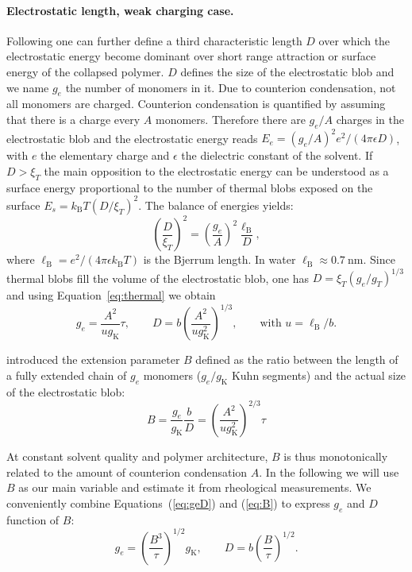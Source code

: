 \documentclass[twoside,twocolumn,9pt]{article}
\begin{document}
\paragraph{Electrostatic length, weak charging case.}
Following \citet{Khokhlov1980} one can further define a third characteristic length $D$ over which the electrostatic energy become dominant over short range attraction or surface energy of the collapsed polymer. $D$ defines the size of the electrostatic blob and we name $g_e$ the number of monomers in it. Due to counterion condensation, not all monomers are charged. Counterion condensation is quantified by assuming that there is a charge every $A$ monomers. Therefore there are $g_e/A$ charges in the electrostatic blob and the electrostatic energy reads $E_e = (g_e/A)^2 e^2/(4\pi\epsilon D)$, with $e$ the elementary charge and $\epsilon$ the dielectric constant of the solvent. If $D>\xi_T$ the main opposition to the electrostatic energy can be understood as a surface energy proportional to the number of thermal blobs exposed on the surface $E_s = k_\mathrm{B}T (D/\xi_T)^2$. The balance of energies yields:
\begin{equation}\left(\frac{D}{\xi_T}\right)^2 = \left(\frac{g_e}{A}\right)^2 \frac{\ell_\mathrm{B}}{D},
\label{eq:electrosurface}
\end{equation}
where $\ell_\mathrm{B} = e^2/(4\pi\epsilon k_\mathrm{B}T)$ is the Bjerrum length. In water $\ell_\mathrm{B} \approx \SI{0.7}{\nano\metre}$. Since thermal blobs fill the volume of the electrostatic blob, one has $D = \xi_T \left(g_e/g_T\right)^{1/3}$ and using Equation~\eqref{eq:thermal} we obtain
\begin{equation}
g_e = \frac{A^2}{u g_\mathrm{K}} \tau, \qquad D = b\left(\frac{A^2}{u g_\mathrm{K}^2}\right)^{1/3},\qquad \text{with }u = \ell_\mathrm{B}/b.
\label{eq:geD}
\end{equation}

\citet{Dobrynin1995} introduced the extension parameter $B$ defined as the ratio between the length of a fully extended chain of $g_e$ monomers ($g_e/g_\mathrm{K}$ Kuhn segments) and the actual size of the electrostatic blob: 
\begin{equation}
B = \frac{g_e}{g_\mathrm{K}}\frac{b}{D} = \left(\frac{A^2}{u g_\mathrm{K}^2}\right)^{2/3} \tau
\label{eq:B}
\end{equation}

At constant solvent quality and polymer architecture, $B$ is thus monotonically related to the amount of counterion condensation $A$. In the following we will use $B$ as our main variable and estimate it from rheological measurements. We conveniently combine Equations~(\ref{eq:geD}) and (\ref{eq:B}) to express $g_e$ and $D$ function of $B$:
\begin{equation}
g_e = \left(\frac{B^3}{\tau}\right)^{1/2} g_\mathrm{K},\qquad D = b \left(\frac{B}{\tau}\right)^{1/2}.
\label{eq:geDfromlargeB}
\end{equation}
\end{document}
